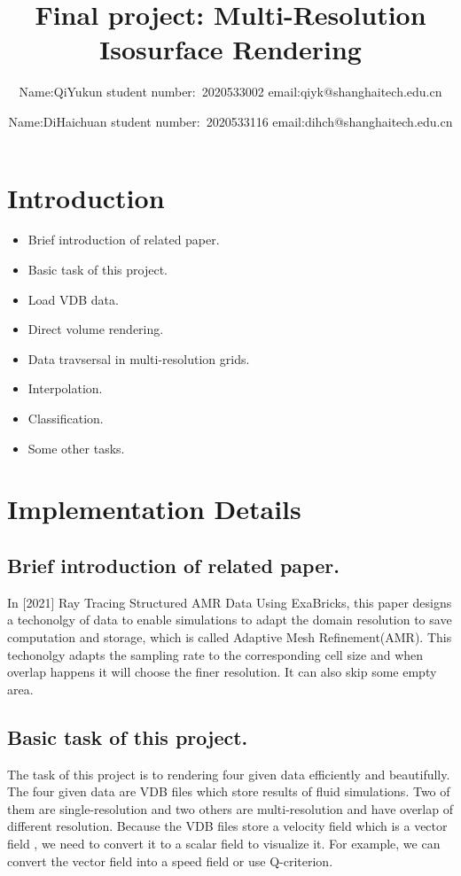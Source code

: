 \documentclass[acmtog]{acmart}
\title{Final project: {Multi-Resolution Isosurface Rendering}}
\author{Name:\quad QiYukun  student number:\ 2020533002
	email:\quad qiyk@shanghaitech.edu.cn\\}
\author{Name:\quad DiHaichuan   student number:\ 2020533116
	email:\quad dihch@shanghaitech.edu.cn}
\begin{document}
	\maketitle
	
	\vspace*{2 ex}
	
	\section{Introduction}
	\begin{itemize}
		\item Brief introduction of related paper.
		\item Basic task of this project.
		\item Load VDB data.
		\item Direct volume rendering.
		\item Data travsersal in multi-resolution grids.
		\item Interpolation.
		\item Classification.
		\item Some other tasks.
	\end{itemize}
	\section{Implementation Details}
	\subsection{Brief introduction of related paper.}
	In [2021] Ray Tracing Structured AMR Data Using ExaBricks, this paper designs a techonolgy of data to enable simulations to adapt the domain resolution to save computation and storage, which is called Adaptive Mesh Refinement(AMR). This techonolgy adapts the sampling rate to the corresponding cell size and when overlap happens it will choose the finer resolution. It can also skip some empty area.
	\subsection{Basic task of this project.}
	The task of this project is to rendering four given data efficiently and beautifully. The four given data are VDB files which store results of fluid simulations. Two of them are single-resolution and two others are multi-resolution and have overlap of different resolution. Because the VDB files store a velocity field which is a vector field , we need to convert it to a scalar field to visualize it. For example, we can convert the vector field into a speed field or use Q-criterion.
\end{document}

